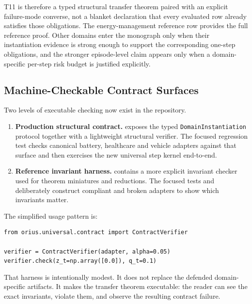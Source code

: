 T11 is therefore a typed structural transfer theorem paired with an explicit
failure-mode converse, not a blanket declaration that every evaluated row
already satisfies those obligations.  The energy-management reference row provides the full reference
proof.  Other domains enter the monograph only when their instantiation
evidence is strong enough to support the corresponding one-step obligations,
and the stronger episode-level claim appears only when a domain-specific
per-step risk budget is justified explicitly.

\subsection{Machine-Checkable Contract Surfaces}

Two levels of executable checking now exist in the repository.

\begin{enumerate}
  \item \textbf{Production structural contract.}
     exposes the typed
    \texttt{DomainInstantiation} protocol together with a lightweight
    structural verifier.  The focused regression test
     checks canonical battery,
    healthcare and vehicle adapters against that surface and then
    exercises the new universal step kernel end-to-end.
  \item \textbf{Reference invariant harness.}
     contains a more explicit invariant
    checker used for theorem miniatures and reductions.  The focused tests
     and
     deliberately construct compliant and
    broken adapters to show which invariants matter.
\end{enumerate}

The simplified usage pattern is:

\begin{verbatim}
from orius.universal.contract import ContractVerifier

verifier = ContractVerifier(adapter, alpha=0.05)
verifier.check(z_t=np.array([0.0]), q_t=0.1)
\end{verbatim}

That harness is intentionally modest.  It does not replace the defended
domain-specific artifacts.  It makes the transfer theorem executable: the
reader can see the exact invariants, violate them, and observe the resulting
contract failure.

